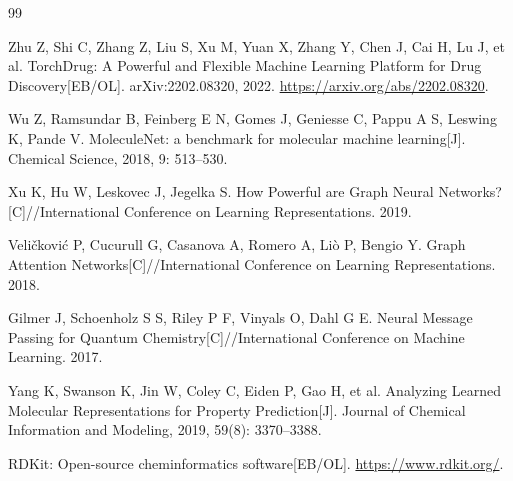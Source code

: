 \documentclass[12pt,hyperref,a4paper,UTF8]{ctexart}
\begin{document}
\begin{thebibliography}{99}

Zhu Z, Shi C, Zhang Z, Liu S, Xu M, Yuan X, Zhang Y, Chen J, Cai H, Lu J, et al. TorchDrug: A Powerful and Flexible Machine Learning Platform for Drug Discovery[EB/OL]. arXiv:2202.08320, 2022. \url{https://arxiv.org/abs/2202.08320}.

Wu Z, Ramsundar B, Feinberg E N, Gomes J, Geniesse C, Pappu A S, Leswing K, Pande V. MoleculeNet: a benchmark for molecular machine learning[J]. Chemical Science, 2018, 9: 513--530.

Xu K, Hu W, Leskovec J, Jegelka S. How Powerful are Graph Neural Networks?[C]//International Conference on Learning Representations. 2019.

Veličković P, Cucurull G, Casanova A, Romero A, Liò P, Bengio Y. Graph Attention Networks[C]//International Conference on Learning Representations. 2018.

Gilmer J, Schoenholz S S, Riley P F, Vinyals O, Dahl G E. Neural Message Passing for Quantum Chemistry[C]//International Conference on Machine Learning. 2017.

Yang K, Swanson K, Jin W, Coley C, Eiden P, Gao H, et al. Analyzing Learned Molecular Representations for Property Prediction[J]. Journal of Chemical Information and Modeling, 2019, 59(8): 3370--3388.

RDKit: Open-source cheminformatics software[EB/OL]. \url{https://www.rdkit.org/}.

\end{thebibliography}
\end{document}
